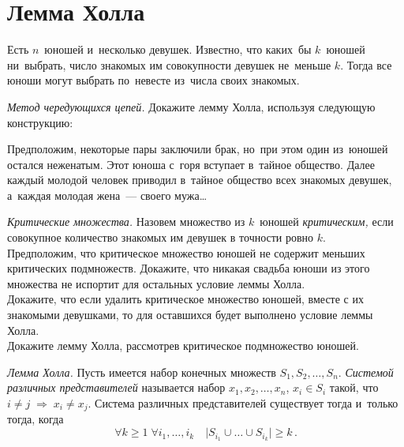 
\section*{Лемма Холла}


Есть $n$~юношей и~несколько девушек.
Известно, что каких~бы $k$~юношей ни~выбрать, число знакомых им совокупности
девушек не~меньше $k$.
Тогда все юноши могут выбрать по~невесте из~числа своих знакомых.

\begingroup
    \def\abs#1{\lvert #1 \rvert}

\begin{problems}

\item \emph{Метод чередующихся цепей.}
Докажите лемму Холла, используя следующую конструкцию:
\begin{list}{}{}\item
    Предположим, некоторые пары заключили брак, но~при этом один из~юношей
    остался неженатым.
    Этот юноша с~горя вступает в~тайное общество.
    Далее каждый молодой человек приводил в~тайное общество всех знакомых
    девушек, а~каждая молодая жена~--- своего мужа\ldots
\end{list}

\item \emph{Критические множества.}
Назовем множество из $k$~юношей \emph{критическим,} если совокупное количество
знакомых им девушек в точности ровно $k$.
\\
\subproblem
Предположим, что критическое множество юношей не содержит меньших критических
подмножеств.
Докажите, что никакая свадьба юноши из этого множества не испортит для
остальных условие леммы Холла.
\\
\subproblem
Докажите, что если удалить критическое множество юношей, вместе с их знакомыми
девушками, то для оставшихся будет выполнено условие леммы Холла.
\\
\subproblem
Докажите лемму Холла, рассмотрев критическое подмножество юношей.

\item \emph{Лемма Холла.}
Пусть имеется набор конечных множеств $S_1, S_2, \ldots, S_n$.
\emph{Системой различных представителей} называется набор
$x_1, x_2, \ldots, x_n$, $x_i \in S_i$ такой, что
\(
    i \neq j
\;\Rightarrow\;
    x_i \neq x_j
\).
Система различных представителей существует тогда и~только тогда, когда
\[
    \forall k \geq 1
\;
    \forall i_1, \ldots, i_k
\quad
    \abs{S_{i_1} \cup \ldots \cup S_{i_k}} \geq k
\, . \]

\end{problems}

